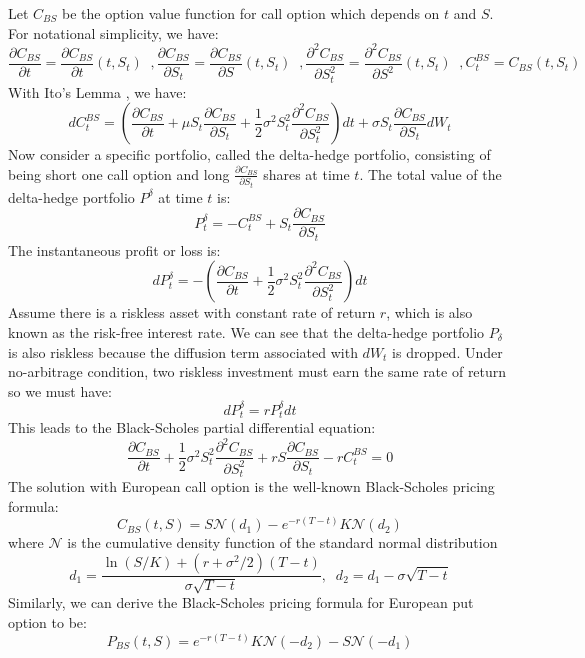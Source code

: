 \documentclass[letterpaper,12pt,titlepage,oneside,final]{book}
\numberwithin{equation}{section}
\theoremstyle{definition}
\begin{document}
Let $C_{BS}$ be the option value function for call option which depends on $t$ and $S$. For notational simplicity, we have:
\[
   \frac{\partial C_{BS}}{\partial t}=\frac{\partial C_{BS}}{\partial t}(t,S_t) \;\;,
   \frac{\partial C_{BS}}{\partial S_t}=\frac{\partial C_{BS}}{\partial S}(t,S_t) \;\;,
   \frac{\partial^2 C_{BS}}{\partial S_t^2}=\frac{\partial^2 C_{BS}}{\partial S^2}(t,S_t) \;\;,
   C^{BS}_t=C_{BS}(t,S_t)
\]
With Ito's Lemma \cite{shreve2004stochastic}, we have:
\[
dC^{BS}_t=\left(\frac{\partial C_{BS}}{\partial t}+\mu S_t \frac{\partial C_{BS}}{\partial S_t}+\frac{1}{2} \sigma^2 S_t^2 \frac{\partial ^2 C_{BS}}{ \partial S_t^2}\right) dt+\sigma S_t \frac{\partial C_{BS}}{\partial S_t}dW_t
\]
 Now consider a specific portfolio, called the delta-hedge portfolio, consisting of being short one call option and long $\frac{\partial C_{BS}}{\partial S_t}$ shares at time $t$.
The total value of the delta-hedge portfolio $P^{\delta}$ at time $t$ is:
\[
P^{\delta}_t=-C^{BS}_t+S_t \frac{\partial C_{BS}}{\partial S_t}
\]
The instantaneous profit or loss is:
\[
dP^{\delta}_t=-\left(\frac{\partial C_{BS}}{ \partial t} +\frac{1}{2} \sigma^2 S_t^2 \frac{\partial^2 C_{BS}}{ \partial S_t^2 } \right) dt
\]
Assume there is a riskless asset with constant rate of return $r$, which is also known as the risk-free interest rate. We can see that the delta-hedge portfolio $P_{\delta}$ is also riskless because the diffusion term associated with $dW_t$ is dropped. Under no-arbitrage condition, two riskless investment must earn the same rate of return so we must have:
\[
dP^{\delta}_{t}=rP^{\delta}_tdt
\]
This leads to the Black-Scholes partial differential equation:
\begin{equation}
\frac{\partial C_{BS}}{\partial t}+\frac{1}{2}\sigma^2 S_t^2 \frac{\partial^2 C_{BS}}{\partial S_t^2}+rS \frac{\partial C_{BS}}{\partial S_t}-rC^{BS}_t=0
\label{eq:bspde}
\end{equation}
The solution with European call option  is the well-known Black-Scholes pricing formula:
\begin{equation}
C_{BS}(t,S)=S  \mathcal{N}(d_1)-e^{-r(T-t)}  K  \mathcal{N}(d_2)
\label{eq:bs}
\end{equation}
where $\mathcal{N}$ is the cumulative density function of the standard normal distribution
\[
d_1=\frac{\ln(S/K)+(r+\sigma^2/2)(T-t)}{\sigma \sqrt{T-t}}, \;\; d_2=d_1-\sigma  \sqrt{T-t}
\]
Similarly, we can derive the Black-Scholes pricing formula for  European put option to be:
\begin{equation}
P_{BS}(t,S)=e^{-r(T-t)}  K   \mathcal{N}(-d_2)-S  \mathcal{N}(-d_1)
\label{eq:bsP}
\end{equation}
\end{document}
